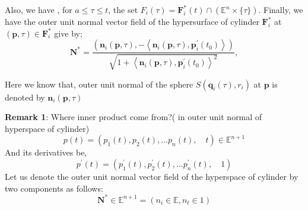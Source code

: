 Also, we have ,  for $a \leq \tau \leq t$,  the set $F_{i}(\tau)=\mathbf{F}_{i}^*(t) \cap\left(\mathbb{E}^{n} \times\{\tau\}\right)$. 
Finally, we have the outer unit normal vector field of the hypersurface of cylinder $\mathbf{F}_{i}^*$ at $(\mathbf{p}, \tau) \in \mathbf{F}_{i}^*$ give by;
$$
\mathbf{N}^*= \frac{\left(\mathbf{n}_{i}(\mathbf{p}, \tau),-\left\langle\mathbf{n}_{i}(\mathbf{p}, \tau), \mathbf{p}_{i}^{\prime}\left(t_{0}\right)\right\rangle\right)}{\sqrt{1+\left\langle\mathbf{n}_{i}(\mathbf{p}, \tau), \mathbf{p}_{i}^{\prime}\left(t_{0}\right)\right\rangle^{2}}},
$$

Here we know that,  outer unit normal of the sphere $S\left(\mathbf{q}_{i}(\tau), r_{i}\right)$ at $\mathbf{p}$ is denoted by $\mathbf{n}_{i}(\mathbf{p}, \tau)$ 
















\textbf{Remark 1}: Where inner product come from?( in outer unit normal of hyperspace of cylinder)
$$
p(t)=(p_1(t),p_2(t),\dots p_n(t),\quad t  ) \in \mathbb{E}^{n+1}
$$
And its derivatives be,
$$
p^{'}(t)=(p_1^{'}(t),p_2^{'}(t),\dots p_n^{'}(t),\quad 1  ) 
$$
Let us denote the outer unit normal vector field of the hyperspace of cylinder by two components as follows:
$$
\mathbf{N}^* \in \mathbb{E}^{n+1} =(n_i\in \mathbb{E},n_t \in 1)
$$


